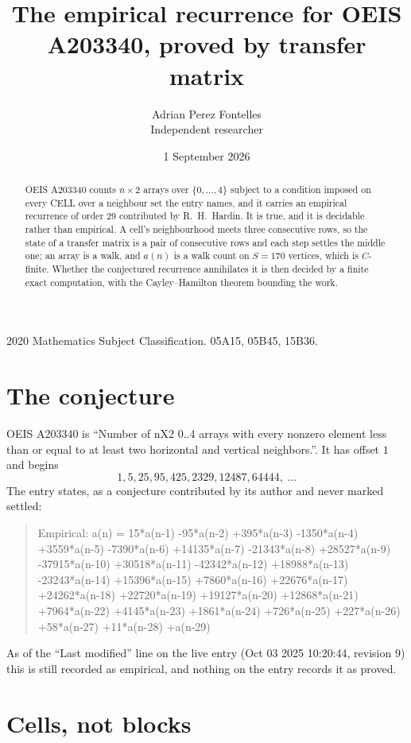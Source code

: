 \documentclass[11pt,a4paper]{article}
\title{The empirical recurrence for OEIS A203340, proved by transfer matrix}
\author{Adrian Perez Fontelles\\ \small Independent researcher}
\date{1 September 2026}
\theoremstyle{plain}
\theoremstyle{definition}
\begin{document}
\maketitle

\begin{abstract}
OEIS A203340 counts $n\times2$ arrays over $\{0,\dots,4\}$ subject to a condition imposed on
every CELL over a neighbour set the entry names, and it carries an empirical recurrence of
order $29$ contributed by R.~H.~Hardin. It is true, and it is decidable rather than
empirical. A cell's neighbourhood meets three consecutive rows, so the state of a transfer
matrix is a pair of consecutive rows and each step settles the middle one; an array is a
walk, and $a(n)$ is a walk count on $S=170$ vertices, which is $C$-finite. Whether the
conjectured recurrence annihilates it is then decided by a finite exact computation, with the
Cayley--Hamilton theorem bounding the work.
\end{abstract}

\noindent\small 2020 Mathematics Subject Classification. 05A15, 05B45, 15B36.\normalsize

\section{The conjecture}

OEIS A203340 is ``Number of nX2 0..4 arrays with every nonzero element less than or equal to at least two horizontal and vertical neighbors.''. It has offset $1$ and begins
\[
1, 5, 25, 95, 425, 2329, 12487, 64444,\ \dots
\]
The entry states, as a conjecture contributed by its author and never marked settled:
\begin{quote}
Empirical: a(n) = 15*a(n-1) -95*a(n-2) +395*a(n-3) -1350*a(n-4) +3559*a(n-5) -7390*a(n-6) +14135*a(n-7) -21343*a(n-8) +28527*a(n-9) -37915*a(n-10) +30518*a(n-11) -42342*a(n-12) +18988*a(n-13) -23243*a(n-14) +15396*a(n-15) +7860*a(n-16) +22676*a(n-17) +24262*a(n-18) +22720*a(n-19) +19127*a(n-20) +12868*a(n-21) +7964*a(n-22) +4145*a(n-23) +1861*a(n-24) +726*a(n-25) +227*a(n-26) +58*a(n-27) +11*a(n-28) +a(n-29)
\end{quote}
As of the ``Last modified'' line on the live entry (Oct 03 2025 10:20:44, revision 9) this is still
recorded as empirical, and nothing on the entry records it as proved.

\section{Cells, not blocks}
\end{document}
